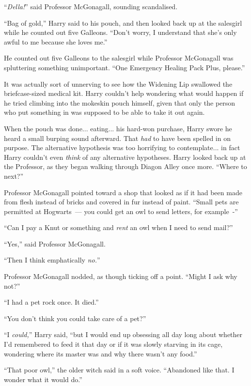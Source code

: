 ``\emph{Della!}'' said Professor McGonagall, sounding scandalised.

``Bag of gold,'' Harry said to his pouch, and then looked back up at the salesgirl while he counted out five Galleons. ``Don't worry, I understand that she's only awful to me because she loves me.''

He counted out five Galleons to the salesgirl while Professor McGonagall was spluttering something unimportant. ``One Emergency Healing Pack Plus, please.''

It was actually sort of unnerving to see how the Widening Lip swallowed the briefcase-sized medical kit. Harry couldn't help wondering what would happen if he tried climbing into the mokeskin pouch himself, given that only the person who put something in was supposed to be able to take it out again.

When the pouch was done... eating... his hard-won purchase, Harry swore he heard a small burping sound afterward. That \emph{had} to have been spelled in on purpose. The alternative hypothesis was too horrifying to contemplate... in fact Harry couldn't even \emph{think} of any alternative hypotheses. Harry looked back up at the Professor, as they began walking through Diagon Alley once more. ``Where to next?''

Professor McGonagall pointed toward a shop that looked as if it had been made from flesh instead of bricks and covered in fur instead of paint. ``Small pets are permitted at Hogwarts~--- you could get an owl to send letters, for example~-''

``Can I pay a Knut or something and \emph{rent} an owl when I need to send mail?''

``Yes,'' said Professor McGonagall.

``Then I think emphatically \emph{no.}''

Professor McGonagall nodded, as though ticking off a point. ``Might I ask why not?''

``I had a pet rock once. It died.''

``You don't think you could take care of a pet?''

``I \emph{could,}'' Harry said, ``but I would end up obsessing all day long about whether I'd remembered to feed it that day or if it was slowly starving in its cage, wondering where its master was and why there wasn't any food.''

``That poor owl,'' the older witch said in a soft voice. ``Abandoned like that. I wonder what it would do.''

